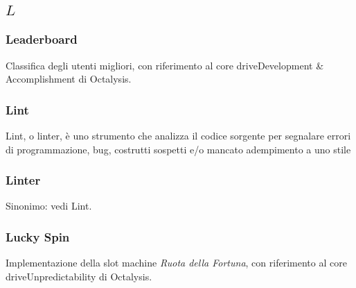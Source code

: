 \subsection*{\quad$L\quad$}
\subsubsection*{Leaderboard}
Classifica degli utenti migliori, con riferimento al core drive\glosp Development \& Accomplishment di Octalysis\glo.

\subsubsection*{Lint}
Lint, o linter, è uno strumento che analizza il codice sorgente per segnalare errori di programmazione, bug, costrutti sospetti e/o mancato adempimento a uno stile
\subsubsection*{Linter}
Sinonimo: vedi Lint\glo.

\subsubsection*{Lucky Spin}
Implementazione della slot machine \textit{Ruota della Fortuna}, con riferimento al core drive\glosp Unpredictability di Octalysis\glo.